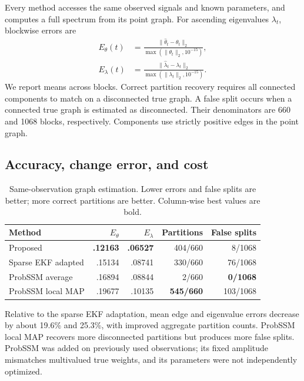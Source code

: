 \documentclass[journal]{IEEEtran}
\begin{document}
Every method accesses the same observed signals and known parameters, and computes a full spectrum from its point graph. For ascending eigenvalues $\lambda_t$, blockwise errors are
\begin{equation}
\begin{aligned}
E_\theta(t)&=\frac{\|\hat\theta_t-\theta_t\|_2}{\max(\|\theta_t\|_2,10^{-15})},\\
E_\lambda(t)&=\frac{\|\hat\lambda_t-\lambda_t\|_2}{\max(\|\lambda_t\|_2,10^{-15})}.
\end{aligned}
\end{equation}
We report means across blocks. Correct partition recovery requires all connected components to match on a disconnected true graph. A false split occurs when a connected true graph is estimated as disconnected. Their denominators are 660 and 1068 blocks, respectively. Components use strictly positive edges in the point graph.

\subsection{Accuracy, change error, and cost}
\begin{table}[t]
\caption{Same-observation graph estimation. Lower errors and false splits are better; more correct partitions are better. Column-wise best values are bold.}\label{tab:main}
\centering\scriptsize\setlength{\tabcolsep}{3pt}
\begin{tabular}{lrrrr}\toprule
Method & $E_\theta$ & $E_\lambda$ & Partitions & False splits\\\midrule
Proposed & \textbf{.12163} & \textbf{.06527} & 404/660 & 8/1068\\
Sparse EKF adapted & .15134 & .08741 & 330/660 & 76/1068\\
ProbSSM average & .16894 & .08844 & 2/660 & \textbf{0/1068}\\
ProbSSM local MAP & .19677 & .10135 & \textbf{545/660} & 103/1068\\\bottomrule
\end{tabular}
\end{table}
Relative to the sparse EKF adaptation, mean edge and eigenvalue errors decrease by about 19.6\% and 25.3\%, with improved aggregate partition counts. ProbSSM local MAP recovers more disconnected partitions but produces more false splits. ProbSSM was added on previously used observations; its fixed amplitude mismatches multivalued true weights, and its parameters were not independently optimized.
\end{document}

